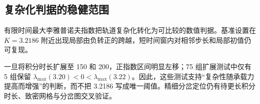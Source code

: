 \subsection{复杂化判据的稳健范围}
有限时间最大李雅普诺夫指数把轨道复杂化转化为可比较的数值判据。基准设置在 $K=3.2186$ 附近出现局部由负转正的跨越，短时间窗内对相邻步长和局部初值仍可复现。

一旦将积分时长扩展至 150 和 200，正指数区间明显左移；75 组扩展测试中仅有 5 组保留 $\lambda_{\max}(3.20)<0<\lambda_{\max}(3.22)$。因此，这些测试支持“复杂性随承载力提高而增强”的判断，而不把 3.2186 写成唯一阈值。精细分岔定位仍有待更长积分时长、致密网格与分岔图交叉验证。

